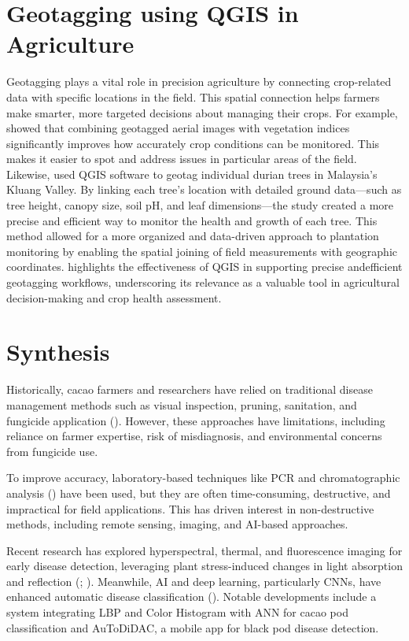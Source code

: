 \section{Geotagging using QGIS in Agriculture}
Geotagging plays a vital role in precision agriculture by connecting crop-related data with specific locations in the field. This spatial connection helps farmers make smarter, more targeted decisions about managing their crops. For example, \cite{Mohidem2021} showed that combining geotagged aerial images with vegetation indices significantly improves how accurately crop conditions can be monitored. This makes it easier to spot and address issues in particular areas of the field. Likewise, \cite{Rahman2021} used QGIS software to geotag individual durian trees in Malaysia’s Kluang Valley. By linking each tree’s location with detailed ground data—such as tree height, canopy size, soil pH, and leaf dimensions—the study created a more precise and efficient way to monitor the health and growth of each tree. This method allowed for a more organized and data-driven approach to plantation monitoring by enabling the spatial joining of field measurements with geographic coordinates. \cite{Rahman2021} highlights the effectiveness of QGIS in supporting precise andefficient geotagging workflows, underscoring its relevance as a valuable tool in agricultural decision-making and crop health assessment.

\section{Synthesis}
Historically, cacao farmers and researchers have relied on traditional disease management methods such as visual inspection, pruning, sanitation, and fungicide application (\cite{AceboGuerrero2012, Aneani2007}). However, these approaches have limitations, including reliance on farmer expertise, risk of misdiagnosis, and environmental concerns from fungicide use.

To improve accuracy, laboratory-based techniques like PCR and chromatographic analysis (\cite{Nguyen2022, Quelal2020}) have been used, but they are often time-consuming, destructive, and impractical for field applications. This has driven interest in non-destructive methods, including remote sensing, imaging, and AI-based approaches.

Recent research has explored hyperspectral, thermal, and fluorescence imaging for early disease detection, leveraging plant stress-induced changes in light absorption and reflection (\cite{Alvarado2023}; \cite{Silva2024}). Meanwhile, AI and deep learning, particularly CNNs, have enhanced automatic disease classification (\cite{BaculioBarbosa2022}). Notable developments include a system integrating LBP and Color Histogram with ANN for cacao pod classification and \cite{Tan2018} AuToDiDAC, a mobile app for black pod disease detection.


